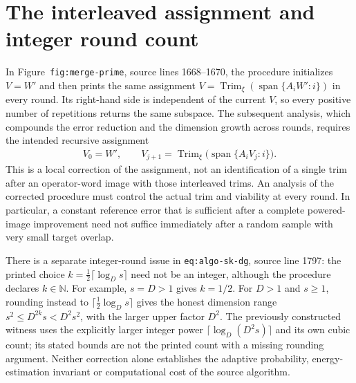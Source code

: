 \documentclass{article}
\begin{document}
\section*{The interleaved assignment and integer round count}

In Figure~\texttt{fig:merge-prime}, source lines 1668--1670, the procedure
initializes $V=W'$ and then prints the same assignment
$V=\operatorname{Trim}_{\xi}(\operatorname{span}\{A_iW':i\})$ in every
round. Its right-hand side is independent of the current $V$, so every
positive number of repetitions returns the same subspace. The subsequent
analysis, which compounds the error reduction and the dimension growth
across rounds, requires the intended recursive assignment
\begin{align}
    V_0=W',\qquad
    V_{j+1}=\operatorname{Trim}_{\xi}
    \bigl(\operatorname{span}\{A_iV_j:i\}\bigr).
    \label{eq:alvv_approximation_recursive_assignment}
\end{align}
This is a local correction of the assignment, not an identification of a
single trim after an operator-word image with those interleaved trims.
An analysis of the corrected procedure must control the actual trim and
viability at every round. In particular, a constant reference error that
is sufficient after a complete powered-image improvement need not suffice
immediately after a random sample with very small target overlap.

There is a separate integer-round issue in
\texttt{eq:algo-sk-dg}, source line 1797: the printed choice
$k=\tfrac12\lceil\log_Ds\rceil$ need not be an integer, although the
procedure declares $k\in\mathbb N$. For example, $s=D>1$ gives
$k=1/2$. For $D>1$ and $s\ge1$, rounding instead to
$\lceil\tfrac12\log_Ds\rceil$ gives the honest dimension range
$s^2\le D^{2k}s<D^2s^2$, with the larger upper
factor $D^2$. The previously constructed witness uses the explicitly
larger integer power $\lceil\log_D(D^2s)\rceil$ and its own cubic count;
its stated bounds are not the printed count with a missing rounding
argument. Neither correction alone establishes the adaptive probability,
energy-estimation invariant or computational cost of the source algorithm.
\end{document}
